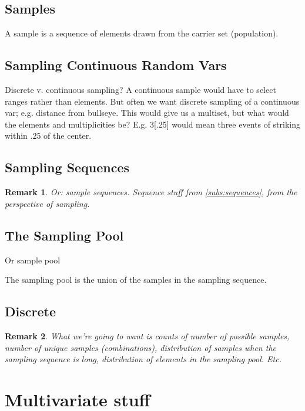 \documentclass[reqno,12pt]{tufte-book}
\numberwithin{equation}{subsection}
\newtheorem{remark}{Remark}
\begin{document}
\section{Samples}

A sample is a sequence of elements drawn from the carrier set (population).

\section{Sampling Continuous Random Vars}

Discrete v. continuous sampling?  A continuous sample would have to
select ranges rather than elements.  But often we want discrete
sampling of a continuous var; e.g. distance from bullseye.  This would
give us a multiset, but what would the elements and multiplicities be?
E.g. {3[.25]} would mean three events of striking within .25 of the
center.

\section{Sampling Sequences}

\begin{remark}
  Or: sample sequences.  Sequence stuff from \ref{subs:sequences}, from the perspective of sampling.
\end{remark}

\section{The Sampling Pool}

Or sample pool

The sampling pool is the union of the samples in the sampling sequence.

\section{Discrete}

\begin{remark}
    What we're going to want is counts of number of possible samples,
    number of unique samples (combinations), distribution of samples
    when the sampling sequence is long, distribution of elements in
    the sampling pool.  Etc.
\end{remark}

\chapter{Multivariate stuff}
\end{document}
